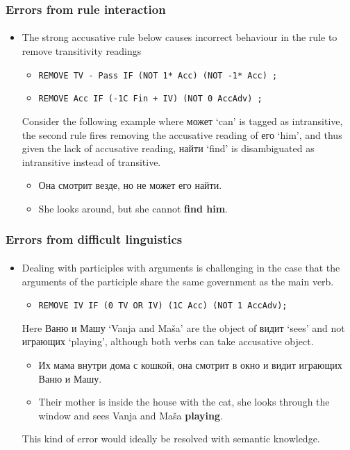 \documentclass{beamer}
\newcommand{\rus}[1]{\foreignlanguage{russian}{#1}}
\begin{document}
\begin{frame}
\frametitle{Errors from rule interaction}
\framesubtitle{}
\begin{itemize}
	\item The strong accusative rule below causes incorrect behaviour in the rule to remove transitivity readings
	\begin{itemize}
		\item \texttt{REMOVE TV - Pass IF (NOT 1* Acc) (NOT -1* Acc) ;}
		\item \texttt{REMOVE Acc IF (-1C Fin + IV) (NOT 0 AccAdv) ;}
	\end{itemize}
	Consider the following example where \rus{может} `can' is tagged as intransitive, the second rule fires removing 
	the accusative reading of \rus{его} `him', and thus given the lack of accusative reading, \rus{найти} `find'
	is disambiguated as intransitive instead of transitive.
 	\begin{itemize}
		\item \rus{Она смотрит везде, но не может его найти.}
		\item She looks around, but she cannot \textbf{find him}.
	\end{itemize}
\end{itemize}
\end{frame}

\begin{frame}
\frametitle{Errors from difficult linguistics}
\framesubtitle{}
\begin{itemize}
	\item Dealing with participles with arguments is challenging in the case that the arguments 
	of the participle share the same government as the main verb.
	\begin{itemize}
		\item \texttt{REMOVE IV IF (0 TV OR IV) (1C Acc) (NOT 1 AccAdv);}
	\end{itemize}
		Here \rus{Ваню и Машу} `Vanja and Maša' are the object of \rus{видит} `sees' and not \rus{играющих} `playing', although
		both verbs can take accusative object.
	\begin{itemize}
		\item \rus{Их мама внутри дома с кошкой, она смотрит в окно и видит играющих Ваню и Машу.}
		\item Their mother is inside the house with the cat, she looks through the window and sees Vanja and Maša \textbf{playing}.
	\end{itemize}
	This kind of error would ideally be resolved with semantic knowledge.
\end{itemize}
\end{frame}
\end{document}
